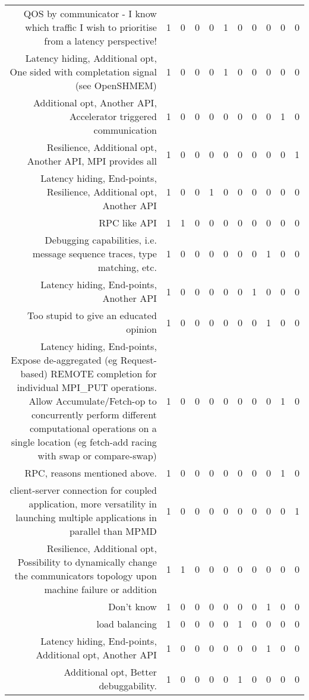 {\begin{landscape}
\begin{longtable}[htb]{r|c|c|c|c|c|c|c|c|c|c}
{QOS by communicator - I know which traffic I wish to prioritise from a latency perspective!} & 1 & 0 & 0 & 0 & 1 & 0 & 0 & 0 & 0 & 0 \\%
{Latency hiding, Additional opt, One sided with completation signal (see OpenSHMEM)} & 1 & 0 & 0 & 0 & 1 & 0 & 0 & 0 & 0 & 0 \\%
{Additional opt, Another API, Accelerator triggered communication} & 1 & 0 & 0 & 0 & 0 & 0 & 0 & 0 & 1 & 0 \\%
{Resilience, Additional opt, Another API, MPI provides all} & 1 & 0 & 0 & 0 & 0 & 0 & 0 & 0 & 0 & 1 \\%
{Latency hiding, End-points, Resilience, Additional opt, Another API} & 1 & 0 & 0 & 1 & 0 & 0 & 0 & 0 & 0 & 0 \\%
{RPC like API} & 1 & 1 & 0 & 0 & 0 & 0 & 0 & 0 & 0 & 0 \\%
{Debugging capabilities, i.e. message sequence traces, type matching, etc.} & 1 & 0 & 0 & 0 & 0 & 0 & 0 & 1 & 0 & 0 \\%
{Latency hiding, End-points, Another API} & 1 & 0 & 0 & 0 & 0 & 0 & 1 & 0 & 0 & 0 \\%
{Too stupid to give an educated opinion} & 1 & 0 & 0 & 0 & 0 & 0 & 0 & 1 & 0 & 0 \\%
{Latency hiding, End-points, Expose de-aggregated (eg Request-based) REMOTE completion for individual MPI\_PUT operations. Allow Accumulate/Fetch-op to concurrently perform different computational operations on a single location (eg fetch-add racing with swap or compare-swap)} & 1 & 0 & 0 & 0 & 0 & 0 & 0 & 0 & 1 & 0 \\%
{RPC, reasons mentioned above.} & 1 & 0 & 0 & 0 & 0 & 0 & 0 & 0 & 1 & 0 \\%
{client-server connection for coupled application, more versatility in launching multiple applications in parallel than MPMD} & 1 & 0 & 0 & 0 & 0 & 0 & 0 & 0 & 0 & 1 \\%
{Resilience, Additional opt, Possibility to dynamically change the communicators topology upon machine failure or addition} & 1 & 1 & 0 & 0 & 0 & 0 & 0 & 0 & 0 & 0 \\%
{Don't know} & 1 & 0 & 0 & 0 & 0 & 0 & 0 & 1 & 0 & 0 \\%
{load balancing} & 1 & 0 & 0 & 0 & 0 & 1 & 0 & 0 & 0 & 0 \\%
{Latency hiding, End-points, Additional opt, Another API} & 1 & 0 & 0 & 0 & 0 & 0 & 0 & 1 & 0 & 0 \\%
{Additional opt, Better debuggability.} & 1 & 0 & 0 & 0 & 0 & 1 & 0 & 0 & 0 & 0 \\%

\end{longtable}
\end{landscape}}
